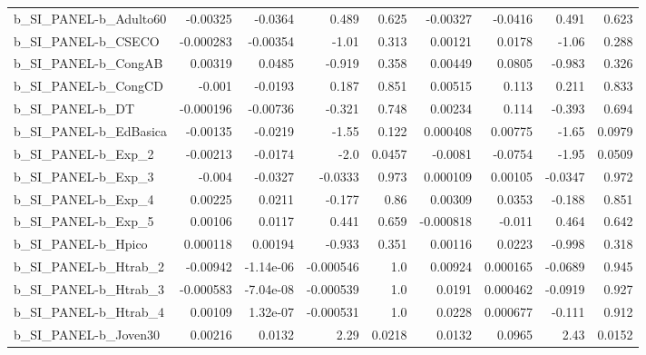 \begin{tabular}{lrrrrrrrr}
b\_SI\_PANEL-b\_Adulto60      &    -0.00325 &      -0.0364 &     0.489 &    0.625 &   -0.00327 &     -0.0416 &        0.491 &         0.623 \\
b\_SI\_PANEL-b\_CSECO         &   -0.000283 &     -0.00354 &     -1.01 &    0.313 &    0.00121 &      0.0178 &        -1.06 &         0.288 \\
b\_SI\_PANEL-b\_CongAB        &     0.00319 &       0.0485 &    -0.919 &    0.358 &    0.00449 &      0.0805 &       -0.983 &         0.326 \\
b\_SI\_PANEL-b\_CongCD        &      -0.001 &      -0.0193 &     0.187 &    0.851 &    0.00515 &       0.113 &        0.211 &         0.833 \\
b\_SI\_PANEL-b\_DT            &   -0.000196 &     -0.00736 &    -0.321 &    0.748 &    0.00234 &       0.114 &       -0.393 &         0.694 \\
b\_SI\_PANEL-b\_EdBasica      &    -0.00135 &      -0.0219 &     -1.55 &    0.122 &   0.000408 &     0.00775 &        -1.65 &        0.0979 \\
b\_SI\_PANEL-b\_Exp\_2         &    -0.00213 &      -0.0174 &      -2.0 &   0.0457 &    -0.0081 &     -0.0754 &        -1.95 &        0.0509 \\
b\_SI\_PANEL-b\_Exp\_3         &      -0.004 &      -0.0327 &   -0.0333 &    0.973 &   0.000109 &     0.00105 &      -0.0347 &         0.972 \\
b\_SI\_PANEL-b\_Exp\_4         &     0.00225 &       0.0211 &    -0.177 &     0.86 &    0.00309 &      0.0353 &       -0.188 &         0.851 \\
b\_SI\_PANEL-b\_Exp\_5         &     0.00106 &       0.0117 &     0.441 &    0.659 &  -0.000818 &      -0.011 &        0.464 &         0.642 \\
b\_SI\_PANEL-b\_Hpico         &    0.000118 &      0.00194 &    -0.933 &    0.351 &    0.00116 &      0.0223 &       -0.998 &         0.318 \\
b\_SI\_PANEL-b\_Htrab\_2       &    -0.00942 &    -1.14e-06 & -0.000546 &      1.0 &    0.00924 &    0.000165 &      -0.0689 &         0.945 \\
b\_SI\_PANEL-b\_Htrab\_3       &   -0.000583 &    -7.04e-08 & -0.000539 &      1.0 &     0.0191 &    0.000462 &      -0.0919 &         0.927 \\
b\_SI\_PANEL-b\_Htrab\_4       &     0.00109 &     1.32e-07 & -0.000531 &      1.0 &     0.0228 &    0.000677 &       -0.111 &         0.912 \\
b\_SI\_PANEL-b\_Joven30       &     0.00216 &       0.0132 &      2.29 &   0.0218 &     0.0132 &      0.0965 &         2.43 &        0.0152 \\

\end{tabular}
